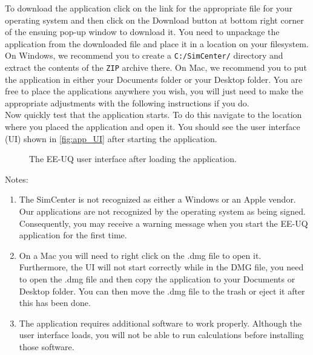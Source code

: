 To download the \getsoftwarename{} application click on the link for
the appropriate file for your operating system and then click on the
Download button at bottom right corner of the ensuing pop-up window to
download it. You need to unpackage the application from the downloaded
file and place it in a location on your filesystem. On Windows, we
recommend you to create a \texttt{C:/SimCenter/\getsoftwarename{}}
directory and extract the contents of the \texttt{ZIP} archive
there. On Mac, we recommend you to put the application in either your
Documents folder or your Desktop folder. You are free to place the
applications anywhere you wish, you will just need to make the
appropriate adjustments with the following instructions if you do. \\

Now quickly test that the application starts. To do this navigate to
the location where you placed the application and open it. You should
see the user interface (UI) shown in \autoref{fig:app_UI} after
starting the application.\\

\begin{figure}[!htbp]
  \caption{The EE-UQ user interface after loading the application.}
  \label{fig:app_UI}
\end{figure}

Notes:
\begin{enumerate}
\item The SimCenter is not recognized as either a Windows or an Apple vendor. Our applications are not recognized by the operating system as being signed. Consequently, you may receive a warning message when you start the EE-UQ application for the first time.
\item  On a Mac you will need to right click on the .dmg file to open it. Furthermore, the UI will not start correctly while in the DMG file, you need to open the .dmg file and then copy the \getsoftwarename{} application to your Documents or Desktop folder. You can then move the .dmg file to the trash or eject it after this has been done.
\item  The \getsoftwarename{} application requires additional software to work properly. Although the user interface loads, you will not be able to run calculations before installing those software.
\end{enumerate}



